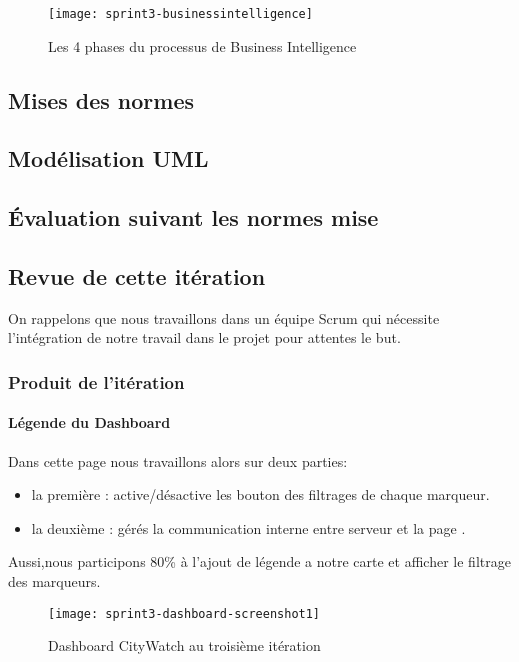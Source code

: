 \begin{figure}[htbp]
  \centering
  \texttt{[image: sprint3-businessintelligence]}
  \caption{Les 4 phases du processus de Business Intelligence}
  \label{fig:sprint3-businessintelligence}
\end{figure}


\subsection{Mises des normes}

\subsection{Modélisation UML}

\subsection{Évaluation suivant les normes mise}
\clearpage
\subsection{Revue de cette itération}
On rappelons que nous travaillons dans un équipe Scrum qui nécessite 
l'intégration de notre travail dans le projet pour attentes le but.
\subsubsection{Produit de l'itération}
\paragraph{Légende du Dashboard}
Dans cette page nous travaillons alors sur deux parties:
\begin{itemize}
 \item la première : active/désactive les bouton des filtrages de chaque marqueur.
 \item la deuxième : gérés la communication interne entre serveur et la page .
 \end{itemize}
Aussi,nous participons 80\% à l'ajout de légende a notre carte
et afficher le filtrage des marqueurs.

\begin{figure}[htbp]
  \centering
  \texttt{[image: sprint3-dashboard-screenshot1]}
  \caption{Dashboard CityWatch au troisième itération}
  \label{fig:sprint3-dashboard-screenshot1}
\end{figure}
\clearpage
